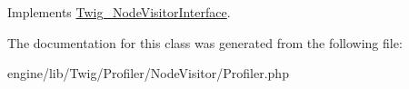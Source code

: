 Implements \hyperlink{interface_twig___node_visitor_interface_a436bb1ae16511148e860e5cfa2cad88f}{Twig\+\_\+\+Node\+Visitor\+Interface}.



The documentation for this class was generated from the following file\+:\begin{DoxyCompactItemize}
\item 
engine/lib/\+Twig/\+Profiler/\+Node\+Visitor/Profiler.\+php\end{DoxyCompactItemize}
